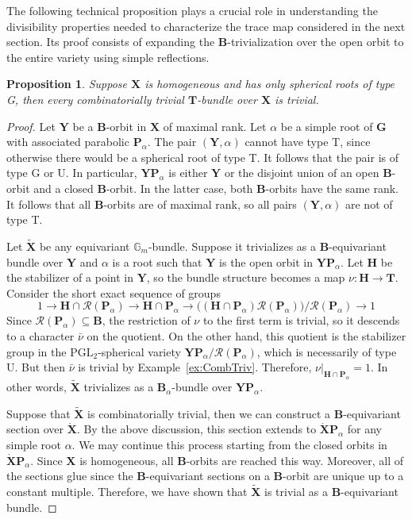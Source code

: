 \documentclass{amsart}
\newtheorem{prop}[theorem]{Proposition}
\theoremstyle{definition}
\theoremstyle{remark}
\newcommand{\1}{\mathbf{1}}
\newcommand{\G}{\mathbf{G}}
\newcommand{\mb}[1]{\mathbf{#1}}
\theoremstyle{definition}
\renewcommand{\G}{\mathbb{G}}
\newcommand{\bG}{\mathbf{G}}
\begin{document}
The following technical proposition plays a crucial role in understanding the divisibility properties needed to characterize the trace map considered in the next section. Its proof consists of expanding the $\mb{B}$-trivialization over the open orbit to the entire variety using simple reflections.

\begin{prop}\label{prop:Triviality}
    Suppose $\mb{X}$ is homogeneous and has only spherical roots of type G, then every combinatorially trivial $\mb{T}$-bundle over $\mb{X}$ is trivial.
\end{prop}
\begin{proof}
    Let $\mb{Y}$ be a $\mb{B}$-orbit in $\mb{X}$ of maximal rank. Let $\alpha$ be a simple root of $\bG$ with associated parabolic $\mb{P}_\alpha$. The pair $(\mb{Y},\alpha)$ cannot have type T, since otherwise there would be a spherical root of type T. It follows that the pair is of type G or U. In particular, $\mb{Y}\mb{P}_\alpha$ is either $\mb{Y}$ or the disjoint union of an open $\mb{B}$-orbit and a closed $\mb{B}$-orbit. In the latter case, both $\mb{B}$-orbits have the same rank. It follows that all $\mb{B}$-orbits are of maximal rank, so all pairs $(\mb{Y},\alpha)$ are not of type T.

    Let $\widetilde{\mb{X}}$ be any equivariant $\G_m$-bundle. Suppose it trivializes as a $\mb{B}$-equivariant bundle over $\mb{Y}$ and $\alpha$ is a root such that $\mb{Y}$ is the open orbit in $\mb{Y}\mb{P}_\alpha$. Let $\mb{H}$ be the stabilizer of a point in $\mb{Y}$, so the bundle structure becomes a map $\nu:\mb{H}\to\mb{T}$. Consider the short exact sequence of groups
    \[
        1\to\mb{H}\cap\mathcal{R}(\mb{P}_\alpha)\to\mb{H}\cap\mb{P}_\alpha\to\big((\mb{H}\cap\mb{P}_\alpha)\mathcal{R}(\mb{P}_\alpha)\big)/\mathcal{R}(\mb{P}_\alpha)\to 1
    \]
    Since $\mathcal{R}(\mb{P}_\alpha)\subseteq\mb{B}$, the restriction of $\nu$ to the first term is trivial, so it descends to a character $\bar{\nu}$ on the quotient. On the other hand, this quotient is the stabilizer group in the $\mathrm{PGL}_2$-spherical variety $\mb{Y}\mb{P}_\alpha/\mathcal{R}(\mb{P}_\alpha)$, which is necessarily of type U. But then $\bar{\nu}$ is trivial by Example~\ref{ex:CombTriv}. Therefore, $\nu|_{\mb{H}\cap\mb{P}_\alpha}=1$. In other words, $\widetilde{\mb{X}}$ trivializes as a $\mb{B}_\alpha$-bundle over $\mb{Y}\mb{P}_\alpha$.

    Suppose that $\widetilde{\mb{X}}$ is combinatorially trivial, then we can construct a $\mb{B}$-equivariant section over $\mathring{\mb{X}}$. By the above discussion, this section extends to $\mathring{\mb{X}}\mb{P}_\alpha$ for any simple root $\alpha$. We may continue this process starting from the closed orbits in $\mathring{\mb{X}}\mb{P}_\alpha$. Since $\mb{X}$ is homogeneous, all $\mb{B}$-orbits are reached this way. Moreover, all of the sections glue since the $\mb{B}$-equivariant sections on a $\mb{B}$-orbit are unique up to a constant multiple. Therefore, we have shown that $\widetilde{\mb{X}}$ is trivial as a $\mb{B}$-equivariant bundle.


\end{proof}
\end{document}

